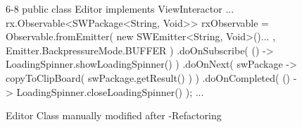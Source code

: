 \begin{figure}[H]
\begin{sourcecode}
\begin{javacode}{6-8}
public class Editor implements ViewInteractor
{
...
		rx.Observable<SWPackage<String, Void>> rxObservable = Observable.fromEmitter( new SWEmitter<String, Void>(){...
		}, Emitter.BackpressureMode.BUFFER )
				.doOnSubscribe( () -> LoadingSpinner.showLoadingSpinner() )
				.doOnNext( swPackage -> copyToClipBoard( swPackage.getResult() ) )
				.doOnCompleted( () -> LoadingSpinner.closeLoadingSpinner() );
...
}
\end{javacode}
\caption{Editor Class manually modified after \toolextension{}-Refactoring}
\label{code:example-editor}
\end{sourcecode}
\end{figure}